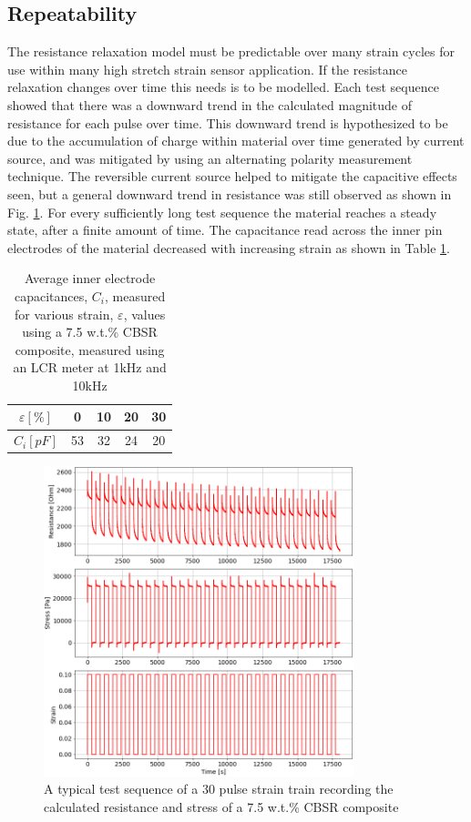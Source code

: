 \subsection{Repeatability}
The resistance relaxation model must be predictable over many strain cycles for use within many high stretch strain sensor application. If the resistance relaxation changes over time this needs is to be modelled. Each test sequence showed that there was a downward trend in the calculated magnitude of resistance for each pulse over time. This downward trend is hypothesized to be due to the accumulation of charge within material over time generated by current source, and was mitigated by using an alternating polarity measurement technique. The reversible current source helped to mitigate the capacitive effects seen, but a general downward trend in resistance was still observed as shown in Fig. \ref{fig:repeatability_pulse_trains}.  For every sufficiently long test sequence the material reaches a steady state, after a finite amount of time. The capacitance read across the inner pin electrodes of the material decreased with increasing strain as shown in Table \ref{tab:capacitance_v_strain}.
\begin{table}[H]
	\centering
	\caption{Average inner electrode capacitances, $C_i$, measured for various strain, $\varepsilon$, values using a 7.5 w.t.\% CBSR composite, measured using an LCR meter at 1kHz and 10kHz \newline}
	\label{tab:capacitance_v_strain}
	\begin{tabular}{c||cccc}
		$\varepsilon [\%]$ & 0 & 10 & 20 & 30 \\
		\hline
		$C_i [pF]$ & 53 & 32 & 24 & 20 \\
	\end{tabular}
\end{table}
\begin{figure}[h!]
	\centering
	\includegraphics[width=9cm]{Figures/30_pulse_AC_2-7-5_Epin_20mm_v3.png}
	\caption{A typical test sequence of a 30 pulse strain train recording the calculated resistance and stress of a 7.5 w.t.\% CBSR composite}
	\label{fig:repeatability_pulse_trains}
\end{figure}
